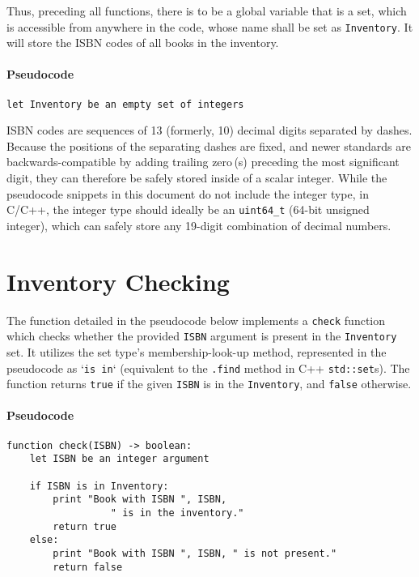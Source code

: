 \documentclass[12pt]{article}
\begin{document}
Thus, preceding all functions, there is to be a global variable that is a set, which is accessible from anywhere in the code, whose name shall be set as \texttt{Inventory}. It will store the ISBN codes of all books in the inventory.

\paragraph{Pseudocode}
\begin{verbatim}
let Inventory be an empty set of integers
\end{verbatim}

ISBN codes are sequences of 13 (formerly, 10) decimal digits separated by dashes. Because the positions of the separating dashes are fixed, and newer standards are backwards-compatible by adding trailing zero\,(s) preceding the most significant digit, they can therefore be safely stored inside of a scalar integer. While the pseudocode snippets in this document do not include the integer type, in C/C++, the integer type should ideally be an \texttt{uint64\_t} (64-bit unsigned integer), which can safely store any 19-digit combination of decimal numbers.

\pagebreak
\section{Inventory Checking}

The function detailed in the pseudocode below implements a \texttt{check} function which checks whether the provided \texttt{ISBN} argument is present in the \linebreak \texttt{Inventory} set. It utilizes the set type's membership-look-up method, represented in the pseudocode as `\texttt{is in}` (equivalent to the \texttt{.find} method in C++ \texttt{std::set}s). The function returns \texttt{true} if the given \texttt{ISBN} is in the \texttt{Inventory}, and \texttt{false} otherwise.

\paragraph{Pseudocode}
\begin{verbatim}
function check(ISBN) -> boolean:
    let ISBN be an integer argument

    if ISBN is in Inventory:
        print "Book with ISBN ", ISBN,
                  " is in the inventory."
        return true
    else:
        print "Book with ISBN ", ISBN, " is not present."
        return false
\end{verbatim}
\end{document}
